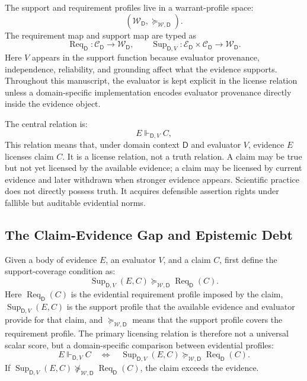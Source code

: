 \documentclass[11pt,a4paper]{article}
\newcommand{\Req}{\operatorname{Req}}
\newcommand{\Sup}{\operatorname{Sup}}
\newcommand{\Dom}{\mathsf{D}}
\begin{document}
The support and requirement profiles live in a warrant-profile space:
\begin{equation}
(\mathcal{W}_{\Dom},\succeq_{\mathcal{W},\Dom}).
\end{equation}
The requirement map and support map are typed as
\begin{equation}
\Req_{\Dom}:\mathcal{C}_{\Dom}\rightarrow\mathcal{W}_{\Dom},
\qquad
\Sup_{\Dom,V}:\mathcal{E}_{\Dom}\times\mathcal{C}_{\Dom}\rightarrow\mathcal{W}_{\Dom}.
\end{equation}
Here $V$ appears in the support function because evaluator provenance, independence, reliability, and grounding affect what the evidence supports. Throughout this manuscript, the evaluator is kept explicit in the license relation unless a domain-specific implementation encodes evaluator provenance directly inside the evidence object.

The central relation is:
\begin{equation}
E\Vdash_{\Dom,V} C,
\end{equation}
This relation means that, under domain context $\Dom$ and evaluator $V$, evidence $E$ licenses claim $C$. It is a license relation, not a truth relation. A claim may be true but not yet licensed by the available evidence; a claim may be licensed by current evidence and later withdrawn when stronger evidence appears. Scientific practice does not directly possess truth. It acquires defensible assertion rights under fallible but auditable evidential norms.

\subsection{The Claim-Evidence Gap and Epistemic Debt}

Given a body of evidence $E$, an evaluator $V$, and a claim $C$, first define the support-coverage condition as:
\begin{equation}
\Sup_{\Dom,V}(E,C)\succeq_{\mathcal{W},\Dom} \Req_{\Dom}(C).
\end{equation}
Here $\Req_{\Dom}(C)$ is the evidential requirement profile imposed by the claim, $\Sup_{\Dom,V}(E,C)$ is the support profile that the available evidence and evaluator provide for that claim, and $\succeq_{\mathcal{W},\Dom}$ means that the support profile covers the requirement profile. The primary licensing relation is therefore not a universal scalar score, but a domain-specific comparison between evidential profiles:
\begin{equation}
E\Vdash_{\Dom,V} C
\quad\Longleftrightarrow\quad
\Sup_{\Dom,V}(E,C)\succeq_{\mathcal{W},\Dom} \Req_{\Dom}(C).
\end{equation}
If $\Sup_{\Dom,V}(E,C)\not\succeq_{\mathcal{W},\Dom}\Req_{\Dom}(C)$, the claim exceeds the evidence.
\end{document}
